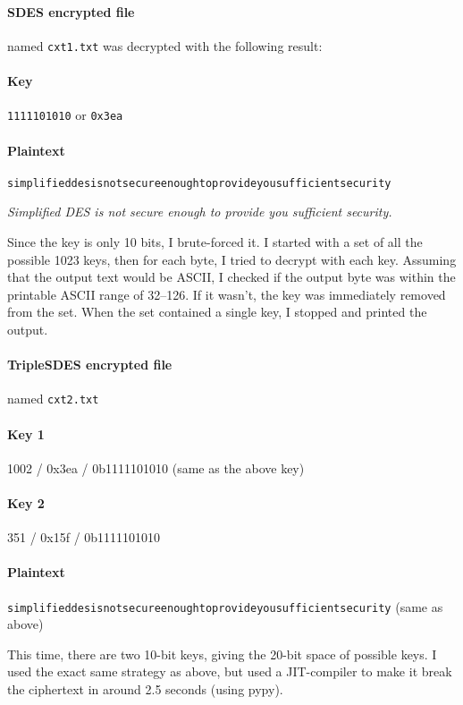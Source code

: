 \documentclass[a4paper,english,12pt]{article}
\begin{document}
\paragraph{SDES encrypted file} named \texttt{cxt1.txt} was decrypted with the
following result:

\paragraph{Key} \texttt{1111101010} or \texttt{0x3ea}

\paragraph{Plaintext}
\texttt{simplifieddesisnotsecureenoughtoprovideyousufficientsecurity}

\begin{center}
\textit{Simplified DES is not secure enough to provide you sufficient security.}
\end{center}

Since the key is only 10 bits, I brute-forced it. I started with a set of all
the possible 1023 keys, then for each byte, I tried to decrypt with each key.
Assuming that the output text would be ASCII, I checked if the output byte was
within the printable ASCII range of 32--126. If it wasn't, the key was
immediately removed from the set. When the set contained a single key, I
stopped and printed the output.

\paragraph{TripleSDES encrypted file} named \texttt{cxt2.txt}

\paragraph{Key 1} 1002 / 0x3ea / 0b1111101010 (same as the above key)
\paragraph{Key 2} 351 / 0x15f / 0b1111101010
\paragraph{Plaintext}
\texttt{simplifieddesisnotsecureenoughtoprovideyousufficientsecurity} (same as
above)

This time, there are two 10-bit keys, giving the 20-bit space of possible keys.
I used the exact same strategy as above, but used a JIT-compiler to make it
break the ciphertext in around 2.5 seconds (using pypy).
\end{document}
